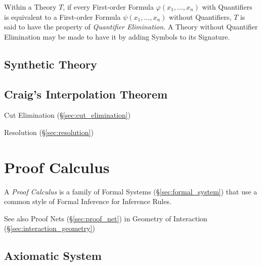 Within a Theory $T$, if every First-order Formula $\varphi(x_1,
\ldots, x_n)$ with Quantifiers is equivalent to a First-order Formula
$\psi(x_1, \ldots, x_n)$ without Quantifiers, $T$ is said to have the
property of \emph{Quantifier Elimination}. A Theory without Quantifier
Elimination may be made to have it by adding Symbols to its Signature.



\subsection{Synthetic Theory}\label{sec:synthetic_theory}

\subsection{Craig's Interpolation Theorem}
\label{sec:interpolation_theorem}

Cut Elimination (\S\ref{sec:cut_elimination})

Resolution (\S\ref{sec:resolution})



\section{Proof Calculus}\label{sec:proof_calculus}

A \emph{Proof Calculus} is a family of Formal Systems
(\S\ref{sec:formal_system}) that use a common style of Formal
Inference for Inference Rules.

\fist See also Proof Nets (\S\ref{sec:proof_net}) in Geometry of
Interaction (\S\ref{sec:interaction_geometry})



\subsection{Axiomatic System} \label{sec:axiomatic_system}


